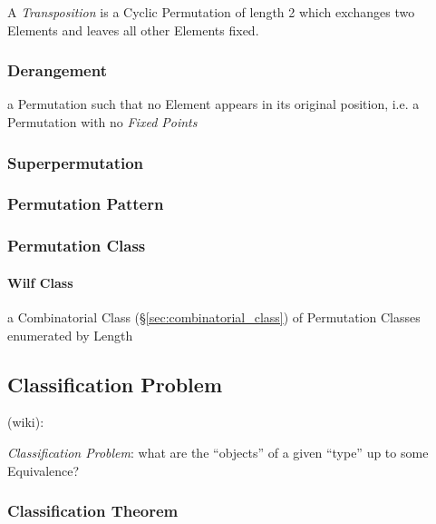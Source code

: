 A \emph{Transposition} is a Cyclic Permutation of length 2 which exchanges two
Elements and leaves all other Elements fixed.



\subsubsection{Derangement}\label{sec:derangement}

a Permutation such that no Element appears in its original position, i.e. a
Permutation with no \emph{Fixed Points}



\subsubsection{Superpermutation}\label{sec:superpermutation}

\subsubsection{Permutation Pattern}\label{sec:permutation_pattern}

\subsubsection{Permutation Class}\label{sec:permutation_class}

\paragraph{Wilf Class}\label{sec:wilf_class}\hfill

a Combinatorial Class (\S\ref{sec:combinatorial_class}) of Permutation Classes
enumerated by Length



\subsection{Classification Problem}\label{sec:classification_problem}

(wiki):

\emph{Classification Problem}: what are the ``objects'' of a given ``type'' up
to some Equivalence?



\subsubsection{Classification Theorem}\label{sec:classification_theorem}

